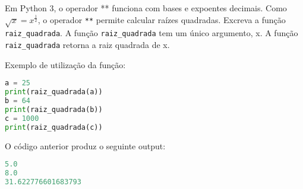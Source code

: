 \documentclass[12pt,varwidth=16cm,border=17pt]{standalone}
\begin{document}
Em Python 3, o operador ** funciona com bases e expoentes decimais.
Como $\sqrt{x}=x^{\frac{1}{2}}$, o operador \verb+**+ permite calcular raízes quadradas.
Excreva a função \verb+raiz_quadrada+. A função \verb+raiz_quadrada+ tem um
único argumento, x. A função \verb+raiz_quadrada+ retorna a raiz quadrada
de x.

Exemplo de utilização da função:

\begin{lstlisting}[language=Python]
a = 25
print(raiz_quadrada(a))
b = 64
print(raiz_quadrada(b))
c = 1000
print(raiz_quadrada(c))
\end{lstlisting}

O código anterior produz o seguinte output:

\begin{lstlisting}[language=Python]
5.0
8.0
31.622776601683793
\end{lstlisting}
\end{document}
